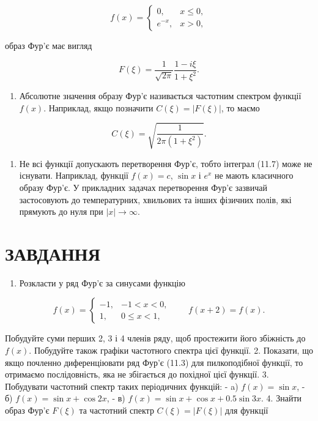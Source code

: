 \documentclass[
  ukrainian,
]{article}
\providecommand{\tightlist}{%
  \setlength{\itemsep}{0pt}\setlength{\parskip}{0pt}}
\begin{document}
\[
f(x)=
\begin{cases}
0, & x \le 0,\\
e^{-x}, & x > 0,
\end{cases}
\]

образ Фур'є має вигляд

\[
F(\xi) = \frac{1}{\sqrt{2\pi}} \frac{1-i\xi}{1+\xi^2}.
\]

\begin{enumerate}
\def\labelenumi{\arabic{enumi}.}
\setcounter{enumi}{1}
\tightlist
\item
  Абсолютне значення образу Фур'є називається частотним спектром функції
  \(f(x)\). Наприклад, якщо позначити \(C(\xi)=|F(\xi)|\), то маємо
\end{enumerate}

\[
C(\xi) = \sqrt{\frac{1}{2\pi(1+\xi^2)}}.
\]

\begin{enumerate}
\def\labelenumi{\arabic{enumi}.}
\setcounter{enumi}{2}
\tightlist
\item
  Не всі функції допускають перетворення Фур'є, тобто інтеграл (11.7)
  може не існувати. Наприклад, функції \(f(x)=c\), \(\sin x\) і \(e^x\)
  не мають класичного образу Фур'є. У прикладних задачах перетворення
  Фур'є зазвичай застосовують до температурних, хвильових та інших
  фізичних полів, які прямують до нуля при \(|x|\to\infty\).
\end{enumerate}

\section{ЗАВДАННЯ}\label{ux437ux430ux432ux434ux430ux43dux43dux44f-8}

\begin{enumerate}
\def\labelenumi{\arabic{enumi}.}
\tightlist
\item
  Розкласти у ряд Фур'є за синусами функцію
\end{enumerate}

\[
f(x)=
\begin{cases}
-1, & -1 < x < 0,\\
1, & 0 \le x < 1,
\end{cases}
\qquad f(x+2)=f(x).
\]

Побудуйте суми перших 2, 3 і 4 членів ряду, щоб простежити його
збіжність до \(f(x)\). Побудуйте також графіки частотного спектра цієї
функції. 2. Показати, що якщо почленно диференціювати ряд Фур'є (11.3)
для пилкоподібної функції, то отримаємо послідовність, яка не збігається
до похідної цієї функції. 3. Побудувати частотний спектр таких
періодичних функцій: - a) \(f(x)=\sin x\), - б) \(f(x)=\sin x+\cos 2x\),
- в) \(f(x)=\sin x+\cos x+0.5\sin 3x\). 4. Знайти образ Фур'є \(F(\xi)\)
та частотний спектр \(C(\xi)=|F(\xi)|\) для функції
\end{document}

